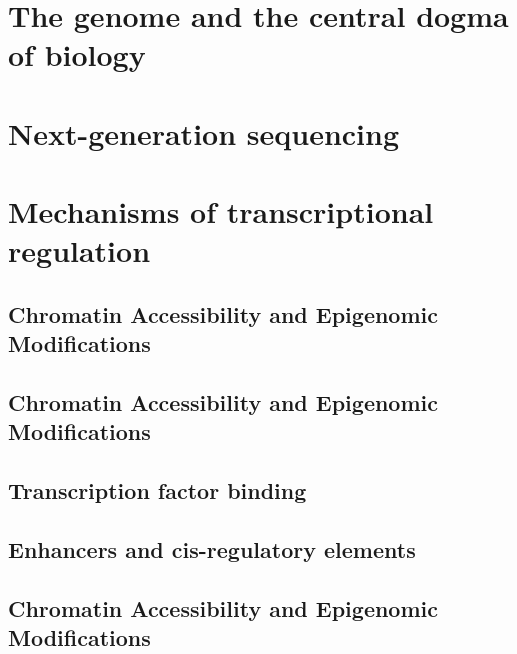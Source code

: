 \begin{dissertationintroduction}
    
\setcounter{chapter}{0}

\label{chap:introduction}

\section{The genome and the central dogma of biology}

\section{Next-generation sequencing}

\section{Mechanisms of transcriptional regulation}

\subsection{Chromatin Accessibility and Epigenomic Modifications}

\subsection{Chromatin Accessibility and Epigenomic Modifications}

\subsection{Transcription factor binding}

\subsection{Enhancers and cis-regulatory elements}

\subsection{Chromatin Accessibility and Epigenomic Modifications}


\end{dissertationintroduction}
